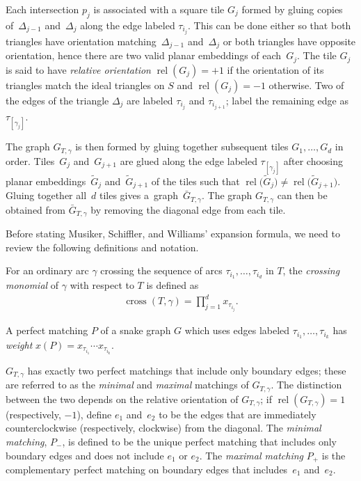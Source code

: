 Each intersection $p_j$ is associated with a square tile $G_j$ formed by gluing copies of~$\Delta_{j-1}$ and~$\Delta_j$ along the edge labeled $\tau_{i_j}$. This can be done either so that both triangles have orientation matching~$\Delta_{j-1}$ and~$\Delta_j$ or both triangles have opposite orientation, hence there are two valid planar embeddings of each~$G_j$. The tile $G_j$ is said to have \emph{relative orientation} $\operatorname{rel}(G_j) = +1$ if the orientation of its triangles match the ideal triangles on $S$ and $\operatorname{rel}(G_j) = -1$ otherwise. Two of the edges of the triangle $\Delta_j$ are labeled $\tau_{i_j}$ and $\tau_{i_{j+1}}$; label the remaining edge as $\tau_{[\gamma_j]}$.

{\sloppy The graph $G_{T,\gamma}$ is then formed by gluing together subsequent tiles $G_{1}, \dots, G_{d}$ in order. Ti\-les~$G_j$ and~$G_{j+1}$ are glued along the edge labeled $\tau_{[\gamma_j]}$ after choosing planar embeddings~$\widetilde{G}_j$ and~$\widetilde{G}_{j+1}$ of the tiles such that $\operatorname{rel}\big(\widetilde{G}_j\big) \neq \operatorname{rel}\big(\widetilde{G}_{j+1}\big)$. Gluing together all~$d$ tiles gives a~graph~$\bar{G}_{T,\gamma}$. The graph $G_{T,\gamma}$ can then be obtained from $\bar{G}_{T,\gamma}$ by removing the diagonal edge from each tile.

}

Before stating Musiker, Schiffler, and Williams' expansion formula, we need to review the following definitions and notation.

\begin{Definition}
For an ordinary arc $\gamma$ crossing the sequence of arcs $\tau_{i_1},\dots,\tau_{i_d}$ in $T$, the \emph{crossing monomial} of $\gamma$ with respect to $T$ is defined as
\begin{gather*}
\operatorname{cross}(T,\gamma) = \prod_{j=1}^d x_{\tau_{i_j}}.
\end{gather*}
\end{Definition}

\begin{Definition}
A perfect matching $P$ of a snake graph $G$ which uses edges labeled $\tau_{i_1}, \dots, \tau_{i_k}$ has \emph{weight} $x(P) = x_{\tau_{i_1}}\cdots x_{\tau_{i_k}}$.
\end{Definition}

\begin{Definition}
$G_{T,\gamma}$ has exactly two perfect matchings that include only boundary edges; these are referred to as the \emph{minimal} and \emph{maximal} matchings of $G_{T,\gamma}$. The distinction between the two depends on the relative orientation of $G_{T,\gamma}$; if $\operatorname{rel}(G_{T,\gamma}) = 1$ (respectively, $-1$), define $e_1$ and~$e_2$ to be the edges that are immediately counterclockwise (respectively, clockwise) from the diagonal. The \emph{minimal matching}, $P_{-}$, is defined to be the unique perfect matching that includes only boundary edges and does not include $e_1$ or $e_2$. The \emph{maximal mat\-ching} $P_{+}$ is the complementary perfect matching on boundary edges that includes~$e_1$ and~$e_2$.
\end{Definition}

